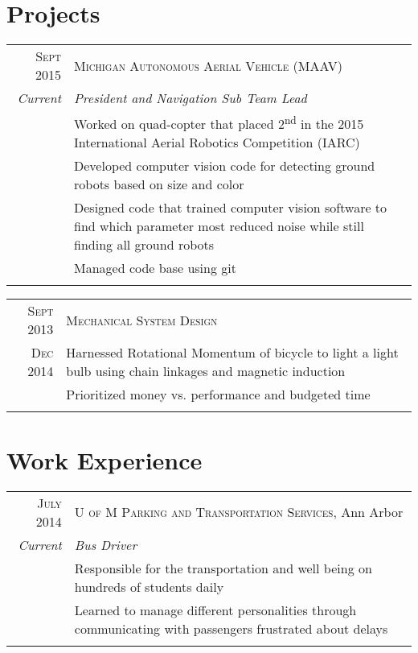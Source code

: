 \documentclass[a4paper,10pt]{article} %
\begin{document}
\section{Projects}

\begin{tabular}{r|p{13cm}}
\textsc{Sept 2015} & \textsc{Michigan Autonomous Aerial Vehicle (MAAV)} \\
\emph{Current} & \emph{President and Navigation Sub Team Lead} \\
& \footnotesize{Worked on quad-copter that placed 2\textsuperscript{nd} in the 2015 International Aerial Robotics Competition (IARC)} \\
& \footnotesize{Developed computer vision code for detecting ground robots based on size and color} \\
& \footnotesize{Designed code that trained computer vision software to find which parameter most reduced noise while still finding all ground robots} \\
& \footnotesize{Managed code base using git} \\
\multicolumn{2}{c}{} \\
\end{tabular}


\begin{tabular}{r|p{13cm}}
\textsc{Sept 2013} & \textsc{Mechanical System Design} \\
\textsc{Dec 2014} & \footnotesize{Harnessed Rotational Momentum of bicycle to light a light bulb using chain linkages and magnetic induction} \\
& \footnotesize{Prioritized money vs. performance and budgeted time} \\
\multicolumn{2}{c}{} \\
\end{tabular}


\section{Work Experience}

\begin{tabular}{r|p{13cm}}
\textsc{July 2014} & \textsc{U of M Parking and Transportation Services}, Ann Arbor \\
\emph{Current} & \emph{Bus Driver} \\
& \footnotesize{Responsible for the transportation and well being on hundreds of students daily} \\
& \footnotesize{Learned to manage different personalities through communicating
  with passengers frustrated about delays} \\
\multicolumn{2}{c}{} \\
\end{tabular}
\end{document}
